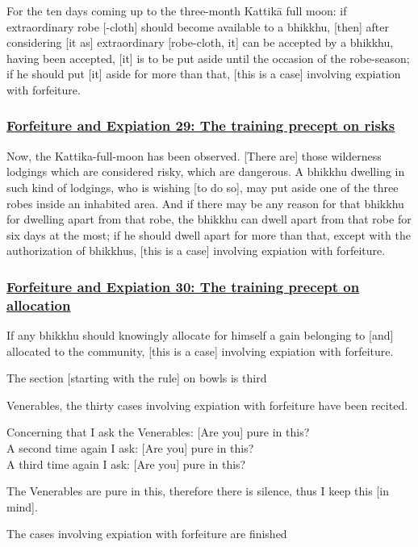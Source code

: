 For the ten days coming up to the three-month Kattikā full moon: if extraordinary robe [-cloth] should become available to a bhikkhu, [then] after considering [it as] extraordinary [robe-cloth, it] can be accepted by a bhikkhu, having been accepted, [it] is to be put aside until the occasion of the robe-season; if he should put [it] aside for more than that, [this is a case] involving expiation with forfeiture.



\subsubsection*{\hyperref[np29]{Forfeiture and Expiation 29: The training precept on risks}}
\label{forf-exp29}

Now, the Kattika-full-moon has been observed. [There are] those wilderness lodgings which are considered risky, which are dangerous. A bhikkhu dwelling in such kind of lodgings, who is wishing [to do so], may put aside one of the three robes inside an inhabited area. And if there may be any reason for that bhikkhu for dwelling apart from that robe, the bhikkhu can dwell apart from that robe for six days at the most; if he should dwell apart for more than that, except with the authorization of bhikkhus, [this is a case] involving expiation with forfeiture.



\subsubsection*{\hyperref[np30]{Forfeiture and Expiation 30: The training precept on allocation}}
\label{forf-exp30}

If any bhikkhu should knowingly allocate for himself a gain belonging to [and] allocated to the community, [this is a case] involving expiation with forfeiture.

\begin{center}
	The section [starting with the rule] on bowls is third
\end{center}



\medskip

\begin{center}
	Venerables, the thirty cases involving expiation with forfeiture have been recited.

	\smallskip

	Concerning that I ask the Venerables: [Are you] pure in this?\\
	A second time again I ask: [Are you] pure in this?\\
	A third time again I ask: [Are you] pure in this?

	\smallskip

	The Venerables are pure in this, therefore there is silence, thus I keep this [in mind].
\end{center}

\begin{outro}
	The cases involving expiation with forfeiture are finished
\end{outro}

\clearpage

